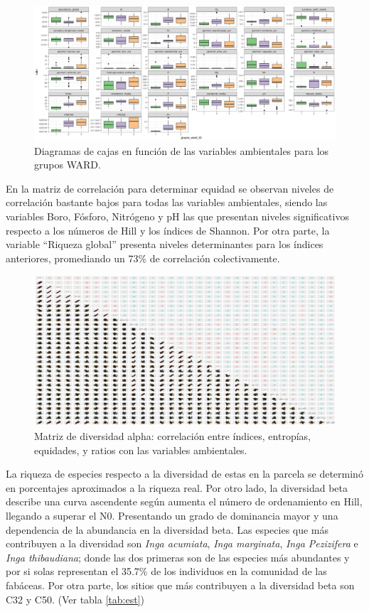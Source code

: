 \documentclass[11pt,]{article}
\begin{document}
\begin{figure}
\centering
\includegraphics[width=1.00000\textwidth]{WARD_Plots_Variables_Ambientales_Clusters.png}
\caption{Diagramas de cajas en función de las variables ambientales para
los grupos WARD.\label{fig:boxW}}
\end{figure}

En la matriz de correlación para determinar equidad se observan niveles
de correlación bastante bajos para todas las variables ambientales,
siendo las variables Boro, Fósforo, Nitrógeno y pH las que presentan
niveles significativos respecto a los números de Hill y los índices de
Shannon. Por otra parte, la variable ``Riqueza global'' presenta niveles
determinantes para los índices anteriores, promediando un 73\% de
correlación colectivamente.

\begin{figure}
\centering
\includegraphics[width=1.00000\textwidth]{Analisis/Diversidad/Indices_Env_Diversidad_Alpha_2.png}
\caption{Matriz de diversidad alpha: correlación entre índices,
entropías, equidades, y ratios con las variables
ambientales.\label{fig:divA}}
\end{figure}

La riqueza de especies respecto a la diversidad de estas en la parcela
se determinó en porcentajes aproximados a la riqueza real. Por otro
lado, la diversidad beta describe una curva ascendente según aumenta el
número de ordenamiento en Hill, llegando a superar el N0. Presentando un
grado de dominancia mayor y una dependencia de la abundancia en la
diversidad beta. Las especies que más contribuyen a la diversidad son
\emph{Inga acumiata}, \emph{Inga marginata}, \emph{Inga Pezizifera} e
\emph{Inga thibaudiana}; donde las dos primeras son de las especies más
abundantes y por si solas representan el 35.7\% de los individuos en la
comunidad de las fabáceas. Por otra parte, los sitios que más
contribuyen a la diversidad beta son C32 y C50. (Ver tabla
\ref{tab:est})
\end{document}
